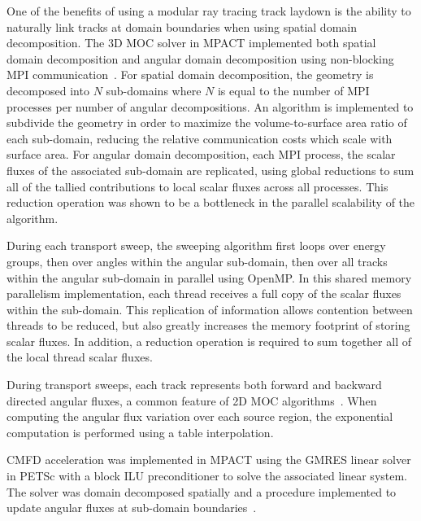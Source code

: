 One of the benefits of using a modular ray tracing track laydown is the ability to naturally link tracks at domain boundaries when using spatial domain decomposition. The 3D \ac{MOC} solver in MPACT implemented both spatial domain decomposition and angular domain decomposition using non-blocking \ac{MPI} communication~\cite{mpi}. For spatial domain decomposition, the geometry is decomposed into $N$ sub-domains where $N$ is equal to the number of \ac{MPI} processes per number of angular decompositions. An algorithm is implemented to subdivide the geometry in order to maximize the volume-to-surface area ratio of each sub-domain, reducing the relative communication costs which scale with surface area. For angular domain decomposition, each \ac{MPI} process, the scalar fluxes of the associated sub-domain are replicated, using global reductions to sum all of the tallied contributions to local scalar fluxes across all processes. This reduction operation was shown to be a bottleneck in the parallel scalability of the algorithm.

During each transport sweep, the sweeping algorithm first loops over energy groups, then over angles within the angular sub-domain, then over all tracks within the angular sub-domain in parallel using OpenMP. In this shared memory parallelism implementation, each thread receives a full copy of the scalar fluxes within the sub-domain. This replication of information allows contention between threads to be reduced, but also greatly increases the memory footprint of storing scalar fluxes. In addition, a reduction operation is required to sum together all of the local thread scalar fluxes.


During transport sweeps, each track represents both forward and backward directed angular fluxes, a common feature of 2D \ac{MOC} algorithms~\cite{kochunas2007twoway}. When computing the angular flux variation over each source region, the exponential computation is performed using a table interpolation.

\ac{CMFD} acceleration was implemented in MPACT using the \ac{GMRES} linear solver in PETSc with a block ILU preconditioner to solve the associated linear system. The solver was domain decomposed spatially and a procedure implemented to update angular fluxes at sub-domain boundaries~\cite{mpact_dd_cmfd}.

